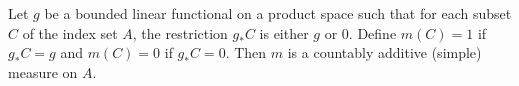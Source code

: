 Let $g$ be a bounded linear functional on a product space such that for each subset $C$ of the index set $A$, the restriction $g_*C$ is either $g$ or $0$. Define $m(C) = 1$ if $g_*C = g$ and $m(C) = 0$ if $g_*C = 0$. Then $m$ is a countably additive (simple) measure on $A$.
